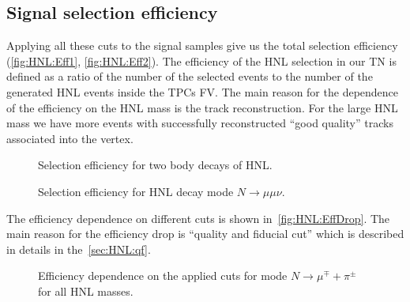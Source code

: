 \documentclass[../main.tex]{subfiles}
\begin{document}
\subsection{Signal selection efficiency}
\label{sec:HNL:eff}

Applying all these cuts to the signal samples give us the total selection efficiency (\autoref{fig:HNL:Eff1}, \autoref{fig:HNL:Eff2}). The efficiency of the HNL selection in our TN is defined as a ratio of the number of the selected events to the number of the generated HNL events inside the TPCs FV. The main reason for the dependence of the efficiency on the HNL mass is the track reconstruction. For the large HNL mass we have more events with successfully reconstructed ``good quality'' tracks associated into the vertex.

\begin{figure}[!ht]
  \begin{minipage}{0.49\linewidth}
  \end{minipage}
  \hfill
  \begin{minipage}{0.49\linewidth}
  \end{minipage}
  \caption{Selection efficiency for two body decays of HNL.}
  \label{fig:HNL:Eff1}
\end{figure}

\begin{figure}[!ht]
  \caption{Selection efficiency for HNL decay mode $N\to\mu\mu\nu$.}
  \label{fig:HNL:Eff2}
\end{figure}
The efficiency dependence on different cuts is shown in~\autoref{fig:HNL:EffDrop}. The main reason for the efficiency drop is ``quality and fiducial cut'' which is described in details in the~\autoref{sec:HNL:qf}.
\begin{figure}[!ht]
  \caption{Efficiency dependence on the applied cuts for mode $N\to\mu^\mp+\pi^\pm$ for all HNL masses.}
  \label{fig:HNL:EffDrop}
\end{figure}
\end{document}

